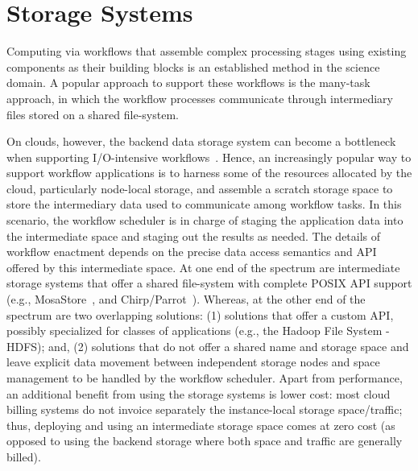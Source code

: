 \documentclass[10pt,journal,cspaper,compsoc]{IEEEtran}
\begin{document}
\section{Storage Systems}\label{sec:storage}


Computing via workflows that assemble complex processing stages using existing
components as their building blocks is an established method in the science
domain. A popular approach to support these workflows is the many-task
approach, in which the workflow processes communicate through intermediary
files stored on a shared file-system.

On clouds, however, the backend data storage system can become a bottleneck
when supporting I/O-intensive workflows~\cite{works-ame}. Hence, an
increasingly popular way to support workflow applications is to harness some of
the resources allocated by the cloud, particularly node-local storage, and
assemble a scratch storage space to store the intermediary data used to
communicate among workflow tasks. In this scenario,
the workflow scheduler is in charge of staging the application data into the
intermediate space and staging out the results as needed. The details of
workflow enactment depends on the precise data access semantics and API offered
by this intermediate space. At one end of the spectrum are intermediate storage
systems that offer a shared file-system with complete POSIX API support (e.g.,
MosaStore~\cite{MosaStore_2010, MosaStore_2012}, and
Chirp/Parrot~\cite{chirp}). Whereas, at the other end of the spectrum are two
overlapping solutions: (1) solutions that offer a custom API, possibly
specialized for classes of applications (e.g., the Hadoop File System - HDFS);
and, (2) solutions that do not offer a shared name and storage space and leave
explicit data movement between independent storage nodes and space management
to be handled by the workflow scheduler. Apart from performance, an additional
benefit from using the storage systems is lower cost: most cloud billing
systems do not invoice separately the instance-local storage space/traffic;
thus, deploying and using an intermediate storage space comes at zero cost (as
opposed to using the backend storage where both space and traffic are generally
billed). 
%
\end{document}
